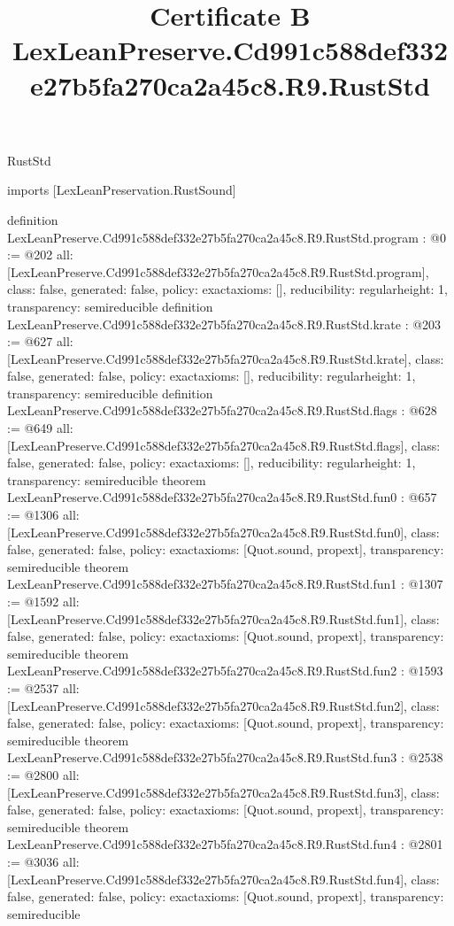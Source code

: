 \begin{lexlean}{RustStd}
\title{Certificate B LexLeanPreserve.Cd991c588def332e27b5fa270ca2a45c8.R9.RustStd}
\begin{coremodule}
imports [LexLeanPreservation.RustSound]

definition LexLeanPreserve.Cd991c588def332e27b5fa270ca2a45c8.R9.RustStd.program : @0 := @202 {
  all: [LexLeanPreserve.Cd991c588def332e27b5fa270ca2a45c8.R9.RustStd.program],
  class: false,
  generated: false,
  policy: exact{axioms: []},
  reducibility: regular{height: 1},
  transparency: semireducible
}
definition LexLeanPreserve.Cd991c588def332e27b5fa270ca2a45c8.R9.RustStd.krate : @203 := @627 {
  all: [LexLeanPreserve.Cd991c588def332e27b5fa270ca2a45c8.R9.RustStd.krate],
  class: false,
  generated: false,
  policy: exact{axioms: []},
  reducibility: regular{height: 1},
  transparency: semireducible
}
definition LexLeanPreserve.Cd991c588def332e27b5fa270ca2a45c8.R9.RustStd.flags : @628 := @649 {
  all: [LexLeanPreserve.Cd991c588def332e27b5fa270ca2a45c8.R9.RustStd.flags],
  class: false,
  generated: false,
  policy: exact{axioms: []},
  reducibility: regular{height: 1},
  transparency: semireducible
}
theorem LexLeanPreserve.Cd991c588def332e27b5fa270ca2a45c8.R9.RustStd.fun0 : @657 := @1306 {
  all: [LexLeanPreserve.Cd991c588def332e27b5fa270ca2a45c8.R9.RustStd.fun0],
  class: false,
  generated: false,
  policy: exact{axioms: [Quot.sound, propext]},
  transparency: semireducible
}
theorem LexLeanPreserve.Cd991c588def332e27b5fa270ca2a45c8.R9.RustStd.fun1 : @1307 := @1592 {
  all: [LexLeanPreserve.Cd991c588def332e27b5fa270ca2a45c8.R9.RustStd.fun1],
  class: false,
  generated: false,
  policy: exact{axioms: [Quot.sound, propext]},
  transparency: semireducible
}
theorem LexLeanPreserve.Cd991c588def332e27b5fa270ca2a45c8.R9.RustStd.fun2 : @1593 := @2537 {
  all: [LexLeanPreserve.Cd991c588def332e27b5fa270ca2a45c8.R9.RustStd.fun2],
  class: false,
  generated: false,
  policy: exact{axioms: [Quot.sound, propext]},
  transparency: semireducible
}
theorem LexLeanPreserve.Cd991c588def332e27b5fa270ca2a45c8.R9.RustStd.fun3 : @2538 := @2800 {
  all: [LexLeanPreserve.Cd991c588def332e27b5fa270ca2a45c8.R9.RustStd.fun3],
  class: false,
  generated: false,
  policy: exact{axioms: [Quot.sound, propext]},
  transparency: semireducible
}
theorem LexLeanPreserve.Cd991c588def332e27b5fa270ca2a45c8.R9.RustStd.fun4 : @2801 := @3036 {
  all: [LexLeanPreserve.Cd991c588def332e27b5fa270ca2a45c8.R9.RustStd.fun4],
  class: false,
  generated: false,
  policy: exact{axioms: [Quot.sound, propext]},
  transparency: semireducible
}
\end{coremodule}
\end{lexlean}
